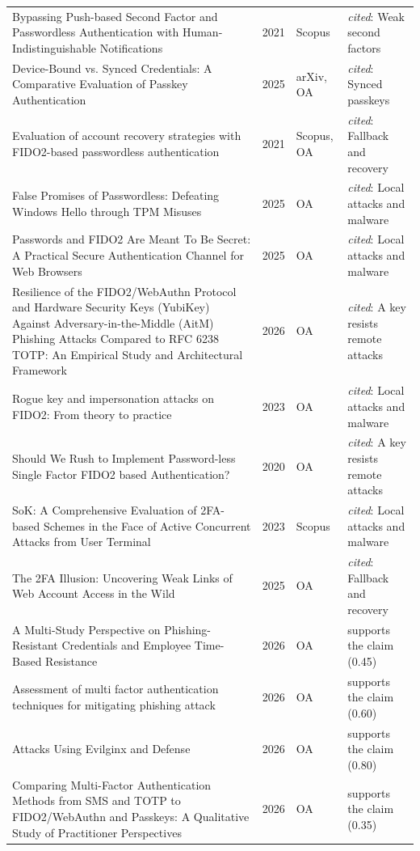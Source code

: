 \begin{longtable}{@{}%
  >{\raggedright\arraybackslash}p{}c%
  >{\raggedright\arraybackslash}p{}%
  >{\raggedright\arraybackslash}p{}@{}}
Bypassing Push-based Second Factor and Passwordless Authentication with Human-Indistinguishable Notifications & 2021 & Scopus & \emph{cited}: Weak second factors \\
Device-Bound vs. Synced Credentials: A Comparative Evaluation of Passkey Authentication & 2025 & arXiv, OA & \emph{cited}: Synced passkeys \\
Evaluation of account recovery strategies with FIDO2-based passwordless authentication & 2021 & Scopus, OA & \emph{cited}: Fallback and recovery \\
False Promises of Passwordless: Defeating Windows Hello through TPM Misuses & 2025 & OA & \emph{cited}: Local attacks and malware \\
Passwords and FIDO2 Are Meant To Be Secret: A Practical Secure Authentication Channel for Web Browsers & 2025 & OA & \emph{cited}: Local attacks and malware \\
Resilience of the FIDO2/WebAuthn Protocol and Hardware Security Keys (YubiKey) Against Adversary-in-the-Middle (AitM) Phishing Attacks Compared to RFC 6238 TOTP: An Empirical Study and Architectural Framework & 2026 & OA & \emph{cited}: A key resists remote attacks \\
Rogue key and impersonation attacks on FIDO2: From theory to practice & 2023 & OA & \emph{cited}: Local attacks and malware \\
Should We Rush to Implement Password-less Single Factor FIDO2 based Authentication? & 2020 & OA & \emph{cited}: A key resists remote attacks \\
SoK: A Comprehensive Evaluation of 2FA-based Schemes in the Face of Active Concurrent Attacks from User Terminal & 2023 & Scopus & \emph{cited}: Local attacks and malware \\
The 2FA Illusion: Uncovering Weak Links of Web Account Access in the Wild & 2025 & OA & \emph{cited}: Fallback and recovery \\
A Multi-Study Perspective on Phishing-Resistant Credentials and Employee Time-Based Resistance & 2026 & OA & supports the claim (0.45) \\
Assessment of multi factor authentication techniques for mitigating phishing attack & 2026 & OA & supports the claim (0.60) \\
Attacks Using Evilginx and Defense & 2026 & OA & supports the claim (0.80) \\
Comparing Multi-Factor Authentication Methods from SMS and TOTP to FIDO2/WebAuthn and Passkeys: A Qualitative Study of Practitioner Perspectives & 2026 & OA & supports the claim (0.35) \\

\end{longtable}
